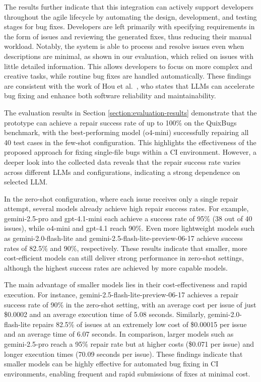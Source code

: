 The results further indicate that this integration can actively support developers throughout the agile lifecycle by automating the design, development, and testing stages for bug fixes. Developers are left primarily with specifying requirements in the form of issues and reviewing the generated fixes, thus reducing their manual workload. Notably, the system is able to process and resolve issues even when descriptions are minimal, as shown in our evaluation, which relied on issues with little detailed information. This allows developers to focus on more complex and creative tasks, while routine bug fixes are handled automatically. These findings are consistent with the work of Hou et al.~\cite{houLargeLanguageModels2024}, who states that LLMs can accelerate bug fixing and enhance both software reliability and maintainability.

The evaluation results in Section \ref{section:evaluation-results} demonstrate that the prototype can achieve a repair success rate of up to 100\% on the QuixBugs benchmark, with the best-performing model (o4-mini) successfully repairing all 40 test cases in the few-shot configuration. This highlights the effectiveness of the proposed approach for fixing single-file bugs within a CI environment. However, a deeper look into the collected data reveals that the repair success rate varies across different LLMs and configurations, indicating a strong dependence on selected LLM.

In the zero-shot configuration, where each issue receives only a single repair attempt, several models already achieve high repair success rates. For example, gemini-2.5-pro and gpt-4.1-mini each achieve a success rate of 95\% (38 out of 40 issues), while o4-mini and gpt-4.1 reach 90\%. Even more lightweight models such as gemini-2.0-flash-lite and gemini-2.5-flash-lite-preview-06-17 achieve success rates of 82.5\% and 90\%, respectively. These results indicate that smaller, more cost-efficient models can still deliver strong performance in zero-shot settings, although the highest success rates are achieved by more capable models.

The main advantage of smaller models lies in their cost-effectiveness and rapid execution. For instance, gemini-2.5-flash-lite-preview-06-17 achieves a repair success rate of 90\% in the zero-shot setting, with an average cost per issue of just \$0.0002 and an average execution time of 5.08 seconds. Similarly, gemini-2.0-flash-lite repairs 82.5\% of issues at an extremely low cost of \$0.00015 per issue and an average time of 6.07 seconds. In comparison, larger models such as gemini-2.5-pro reach a 95\% repair rate but at higher costs (\$0.071 per issue) and longer execution times (70.09 seconds per issue). These findings indicate that smaller models can be highly effective for automated bug fixing in CI environments, enabling frequent and rapid submissions of fixes at minimal cost.

